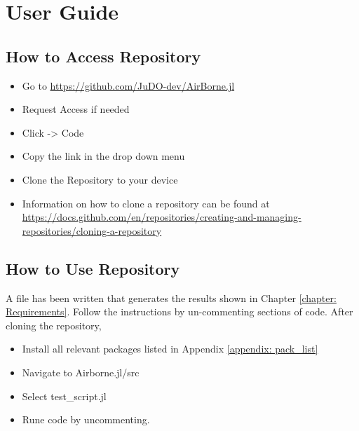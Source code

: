 \chapter{User Guide}
\label{chapter: User_Guide}
\section{How to Access Repository}

\begin{itemize}
    \item Go to \hyperlink{}{https://github.com/JuDO-dev/AirBorne.jl}
    \item Request Access if needed
    \item Click -> Code
    \item Copy the link in the drop down menu
    \item Clone the Repository to your device
    \item Information on how to clone a repository can be found at \hyperlink{}{https://docs.github.com/en/repositories/creating-and-managing-repositories/cloning-a-repository}
\end{itemize}

\section{How to Use Repository}

A file has been written that generates the results shown in Chapter \ref{chapter: Requirements}. Follow the instructions by un-commenting  sections of code. After cloning the repository,

\begin{itemize}
    \item Install all relevant packages listed in Appendix \ref{appendix: pack_list}
    \item Navigate to Airborne.jl/src
    \item Select test\_script.jl
    \item Rune code by uncommenting.
\end{itemize}
